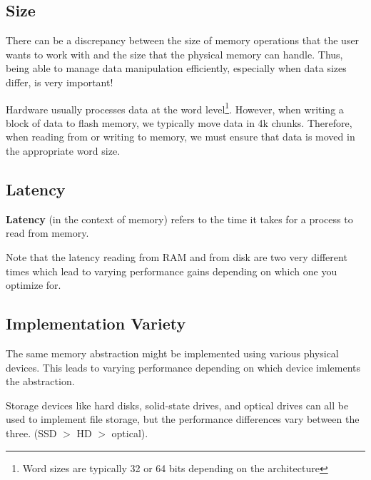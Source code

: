 \documentclass{report}
\begin{document}
\subsection*{Size}
There can be a discrepancy between the size of memory operations that the user wants to work with
and the size that the physical memory can handle. Thus, being able to manage data manipulation
efficiently, especially when data sizes differ, is very important!

\begin{tcolorbox}[colback=blue!5!white,colframe=black!75!blue,title=Example: Caught in 4k] 
  Hardware usually processes data at the word level\footnote{Word sizes are typically 32 or 64 bits
    depending on the architecture}. However, when writing a block of data to flash memory, we
  typically move data in 4k chunks. Therefore, when reading from or writing to memory, we must
  ensure that data is moved in the appropriate word size. 
\end{tcolorbox}


\subsection*{Latency}
\begin{tcolorbox}[title=Definition: Persistent and Transient Memory]
  \textbf{Latency} (in the context of memory) refers to the time it takes for a process to read from
  memory.
\end{tcolorbox}

Note that the latency reading from RAM and from disk are two very different times which lead to
varying performance gains depending on which one you optimize for.


\subsection*{Implementation Variety}
The same memory abstraction might be implemented using various physical devices. This leads to
varying performance depending on which device imlements the abstraction.

\begin{tcolorbox}[colback=blue!5!white,colframe=black!75!blue,title=Example: Caught in 4k] 
  Storage devices like hard disks, solid-state drives, and optical drives can all be used to
  implement file storage, but the performance differences vary between the three. (SSD $>$
  HD $>$ optical).
\end{tcolorbox}
\end{document}
